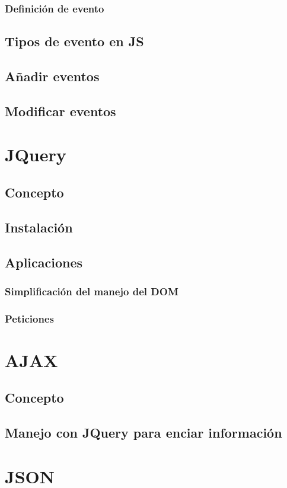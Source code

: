 \documentclass[12pt]{report}
\begin{document}
			\subsubsection{Definición de evento}
		\subsection{Tipos de evento en JS}
		\subsection{Añadir eventos}
		\subsection{Modificar eventos}
	\section{JQuery}
		\subsection{Concepto}
		\subsection{Instalación}
		\subsection{Aplicaciones}
			\subsubsection{Simplificación del manejo del DOM}
			\subsubsection{Peticiones}
	\section{AJAX}
		\subsection{Concepto}
		\subsection{Manejo con JQuery para enciar información}
	\section{JSON}
\end{document}
